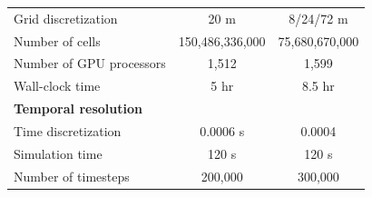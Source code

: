 \begin{table}[!ht]
{\begin{tabular}{@{}lcc@{}}
      Grid discretization           & 20 m                                         & 8/24/72 m                                    \\
      Number of cells               & 150,486,336,000                              & 75,680,670,000                               \\
      Number of GPU processors      & 1,512                                        & 1,599                                        \\
      Wall-clock time               & 5 hr                                         & 8.5 hr                                       \\ \midrule
      \textbf{Temporal resolution}  & \multicolumn{1}{l}{}                         & \multicolumn{1}{l}{}                         \\ \midrule
      Time discretization           & 0.0006 s                                     & 0.0004                                       \\
      Simulation time               & 120 s                                        & 120 s                                        \\
      Number of timesteps           & 200,000                                      & 300,000                                      \\ \bottomrule
    \end{tabular}%
  }
\end{table}
\clearpage

